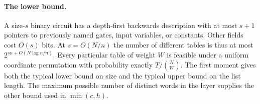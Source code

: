 \documentclass[11pt]{article}
\begin{document}
\paragraph{The lower bound.} A size-$s$ binary circuit has a depth-first backwards description with at most $s+1$ pointers to previously named gates, input variables, or constants. Other fields cost $O(s)$ bits. At $s=O(N/n)$ the number of different tables is thus at most $2^{sn+O(N\log n/n)}$. Every particular table of weight $W$ is feasible under a uniform coordinate permutation with probability exactly $T/\binom NW$. The first moment gives both the typical lower bound on size and the typical upper bound on the list length. The maximum possible number of distinct words in the layer supplies the other bound used in $\min(c,h)$.





\end{document}

